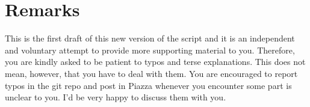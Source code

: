 \section*{Remarks}

This is the first draft of this new version of the script and it is an independent and voluntary attempt to provide more supporting material to you. Therefore, you
are kindly asked to be patient to typos and terse explanations. This does
not mean, however, that you have to deal with them. You are 
encouraged to report typos in the git repo and post in Piazza whenever you encounter
some part is unclear to you. I'd be very happy to discuss them with you.